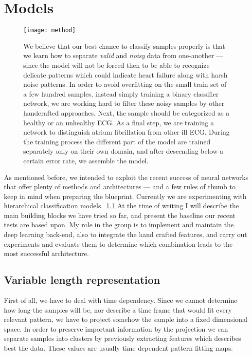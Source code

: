 \chapter{Models}
\begin{figure}[h]
  \centering
  \texttt{[image: method]}\label{fig:method}
  \caption{We believe that our best chance to classify samples properly is that we learn how to separate \textit{valid} and \textit{noisy} data from one-another --- since the model will not be forced then to be able to recognize delicate patterns which could indicate heart failure along with harsh noise patterns. In order to avoid overfitting on the small train set of a few hundred samples, instead simply training a binary classifier network, we are working hard to filter these noisy samples by other handcrafted approaches. Next, the sample should be categorized as a healthy or an unhealthy ECG. As a final step, we are training a network to distinguish atrium fibrillation from other ill ECG. During the training process the different part of the model are trained separately only on their own domain, and after descending below a certain error rate, we assemble the model.}
\end{figure}

As mentioned before, we intended to exploit the recent success of neural networks that offer plenty of methods and architectures --- and a few rules of thumb to keep in mind when preparing the blueprint.
Currently we are experimenting with hierarchical classification models.~\ref{fig:method}
At the time of writing I will describe the main building blocks we have tried so far, and present the baseline our recent tests are based upon.
My role in the group is to implement and maintain the deep learning back-end, also to integrate the hand crafted features, and carry out experiments and evaluate them to determine which combination leads to the most successful architecture.

\section{Variable length representation}
First of all, we have to deal with time dependency. Since we cannot determine how long the samples will be, nor describe a time frame that would fit every relevant pattern, we have to project somehow the sample into a fixed dimensional space. In order to preserve important information by the projection we can separate samples into clusters by previously extracting features which describes best the data. These values are usually time dependent pattern fitting maps.

